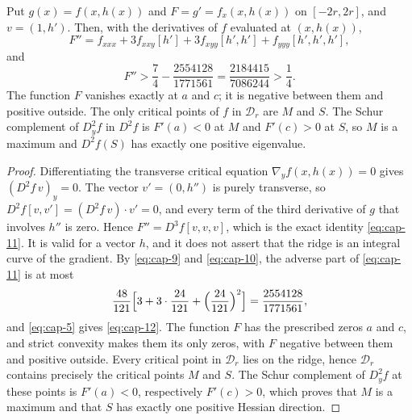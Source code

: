 \begin{lemma}\label{lem:cap-third}
Put $g(x)=f(x,h(x))$ and $F=g'=f_x(x,h(x))$ on $[-2r,2r]$, and $v=(1,h')$. Then, with the derivatives of $f$ evaluated at $(x,h(x))$,
\begin{equation}\label{eq:cap-11}
F''=f_{xxx}+3f_{xxy}[h']+3f_{xyy}[h',h']+f_{yyy}[h',h',h'],
\end{equation}
and
\begin{equation}\label{eq:cap-12}
F''>\frac74-\frac{2554128}{1771561}=\frac{2184415}{7086244}>\frac14 .
\end{equation}
The function $F$ vanishes exactly at $a$ and $c$; it is negative between them and positive outside. The only critical points of $f$ in $\mathcal D_r$ are $M$ and $S$. The Schur complement of $D_y^2f$ in $D^2f$ is $F'(a)<0$ at $M$ and $F'(c)>0$ at $S$, so $M$ is a maximum and $D^2f(S)$ has exactly one positive eigenvalue.
\end{lemma}

\begin{proof}
Differentiating the transverse critical equation $\nabla_yf(x,h(x))=0$ gives $(D^2f\,v)_y=0$. The vector $v'=(0,h'')$ is purely transverse, so $D^2f[v,v']=(D^2f\,v)\cdot v'=0$, and every term of the third derivative of $g$ that involves $h''$ is zero. Hence $F''=D^3f[v,v,v]$, which is the exact identity \eqref{eq:cap-11}. It is valid for a vector $h$, and it does not assert that the ridge is an integral curve of the gradient. By \eqref{eq:cap-9} and \eqref{eq:cap-10}, the adverse part of \eqref{eq:cap-11} is at most
\[
\frac{48}{121}\Bigl[3+3\cdot\frac{24}{121}+\Bigl(\frac{24}{121}\Bigr)^2\Bigr]=\frac{2554128}{1771561},
\]
and \eqref{eq:cap-5} gives \eqref{eq:cap-12}. The function $F$ has the prescribed zeros $a$ and $c$, and strict convexity makes them its only zeros, with $F$ negative between them and positive outside. Every critical point in $\mathcal D_r$ lies on the ridge, hence $\mathcal D_r$ contains precisely the critical points $M$ and $S$. The Schur complement of $D_y^2f$ at these points is $F'(a)<0$, respectively $F'(c)>0$, which proves that $M$ is a maximum and that $S$ has exactly one positive Hessian direction.
\end{proof}

